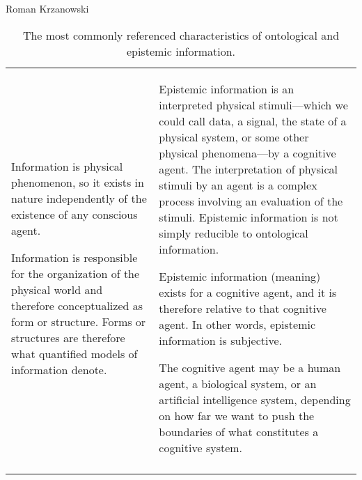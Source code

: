 \begin{artengenv}{Roman Krzanowski}
\begin{small}
\begin{longtable}{p{}p{}}
Information is physical phenomenon, so it exists in nature independently of the existence of any conscious agent.

Information is responsible for the organization of the physical world and therefore conceptualized as form or structure. Forms or structures are therefore what quantified models of information denote.

&
Epistemic information is an interpreted physical stimuli—which we could call data, a signal, the state of a physical system, or some other physical phenomena—by a cognitive agent. The interpretation of physical stimuli by an agent is a complex process involving an evaluation of the stimuli. Epistemic information is not simply reducible to ontological information.

Epistemic information (meaning) exists for a cognitive agent, and it is therefore relative to that cognitive agent. In other words, epistemic information is subjective.

The cognitive agent may be a human agent, a biological system, or an artificial intelligence system, depending on how far we want to push the boundaries of what constitutes a cognitive system.

\\
\caption{The most commonly referenced characteristics of ontological and epistemic information.}\label{tab3-krza}
\end{longtable}
\end{small}


\end{artengenv}
